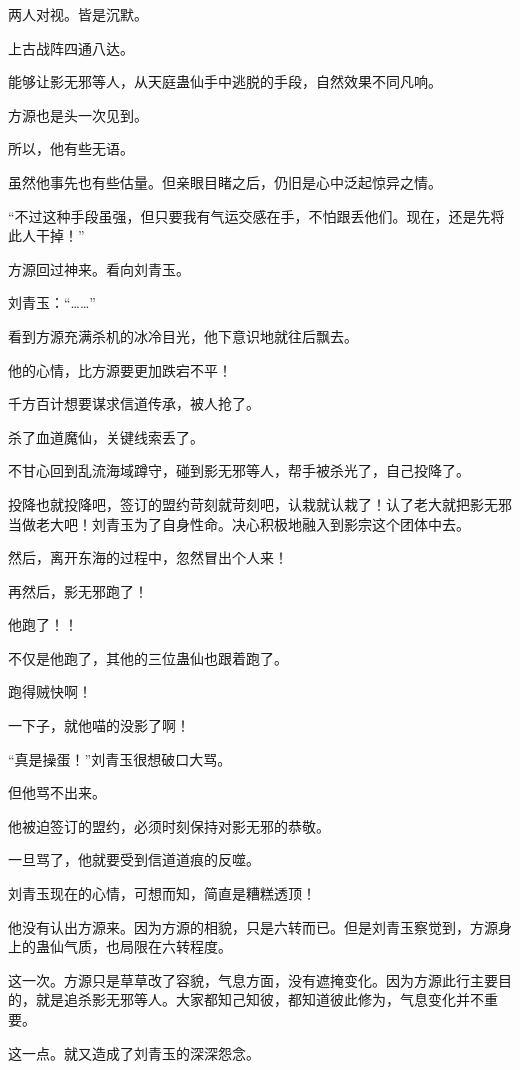 \begin{this_body}
两人对视。皆是沉默。

上古战阵四通八达。

能够让影无邪等人，从天庭蛊仙手中逃脱的手段，自然效果不同凡响。

方源也是头一次见到。

所以，他有些无语。

虽然他事先也有些估量。但亲眼目睹之后，仍旧是心中泛起惊异之情。

“不过这种手段虽强，但只要我有气运交感在手，不怕跟丢他们。现在，还是先将此人干掉！”

方源回过神来。看向刘青玉。

刘青玉：“……”

看到方源充满杀机的冰冷目光，他下意识地就往后飘去。

他的心情，比方源要更加跌宕不平！

千方百计想要谋求信道传承，被人抢了。

杀了血道魔仙，关键线索丢了。

不甘心回到乱流海域蹲守，碰到影无邪等人，帮手被杀光了，自己投降了。

投降也就投降吧，签订的盟约苛刻就苛刻吧，认栽就认栽了！认了老大就把影无邪当做老大吧！刘青玉为了自身性命。决心积极地融入到影宗这个团体中去。

然后，离开东海的过程中，忽然冒出个人来！

再然后，影无邪跑了！

他跑了！！

不仅是他跑了，其他的三位蛊仙也跟着跑了。

跑得贼快啊！

一下子，就他喵的没影了啊！

“真是操蛋！”刘青玉很想破口大骂。

但他骂不出来。

他被迫签订的盟约，必须时刻保持对影无邪的恭敬。

一旦骂了，他就要受到信道道痕的反噬。

刘青玉现在的心情，可想而知，简直是糟糕透顶！

他没有认出方源来。因为方源的相貌，只是六转而已。但是刘青玉察觉到，方源身上的蛊仙气质，也局限在六转程度。

这一次。方源只是草草改了容貌，气息方面，没有遮掩变化。因为方源此行主要目的，就是追杀影无邪等人。大家都知己知彼，都知道彼此修为，气息变化并不重要。

这一点。就又造成了刘青玉的深深怨念。


\end{this_body}
